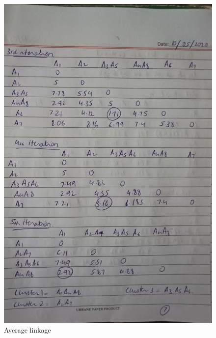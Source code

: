 \documentclass[12pt]{article}
\begin{document}
\begin{figure}
  \includegraphics[width=\linewidth]{7.jpg}
  \caption{Average linkage}
  \label{pic7}
\end{figure}
\end{document}
